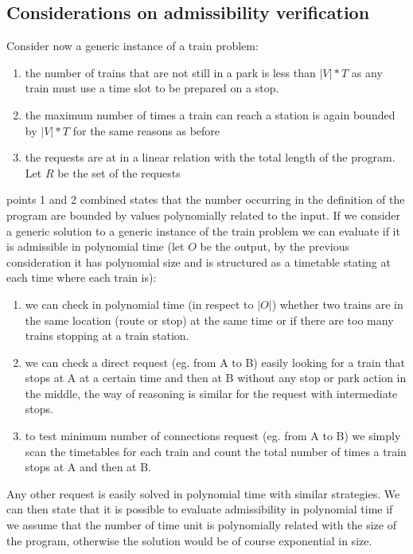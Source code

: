 \documentclass[11pt]{article}
\begin{document}
\subsection{Considerations on admissibility verification }
Consider now a generic instance of a train problem:
\begin{enumerate}
\item the number of trains that are not still in a park is less than $|V|*T$ as any train must use a time slot to be prepared on a stop.
\item the maximum number of times a train can reach a station is again bounded by $|V|*T$ for the same reasons as before
\item the requests are at in a linear relation with the total length of the program. Let $R$ be the set of the requests  
\end{enumerate}
points 1 and 2 combined states that the number occurring in the definition of the program are bounded by values polynomially related to the input. 
If we consider a generic solution to a generic instance of the train problem we can evaluate if it is admissible in
polynomial time (let $O$ be the output, by the previous consideration it has polynomial size and is structured as a timetable stating at each time where each train is):
\begin{enumerate}
\item we can check in polynomial time (in respect to $|O|$) whether two trains are in the same location (route or stop) at the same time or if there are too many trains stopping at a train station. 
\item we can check a direct request (eg. from A to B) easily looking for a train that stops at A at a certain time and then at B without any stop or park action in the middle, the way of reasoning is similar for the request with intermediate stops.
\item to test minimum number of connections request (eg. from A to B) we simply scan the timetables for each train and count the total number of times a train stops at A and then at B. 
\end{enumerate}
Any other request is easily solved in polynomial time with similar strategies. We can then state that it is possible to evaluate admissibility in polynomial time if we assume that
the number of time unit is polynomially related with the size of the program, 
otherwise the solution would be of course exponential in size.
\end{document}
